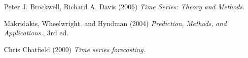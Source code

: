 \begin{thebibliography}{9}
Peter J. Brockwell, Richard A. Davis (2006)  \emph{Time Series: Theory and Methods}.

Makridakis, Wheelwright, and Hyndman (2004) \emph{Prediction, Methods, and Applications.}, 3rd ed.

Chris Chatfield (2000)  \emph{Time series forecasting}.

\end{thebibliography}
